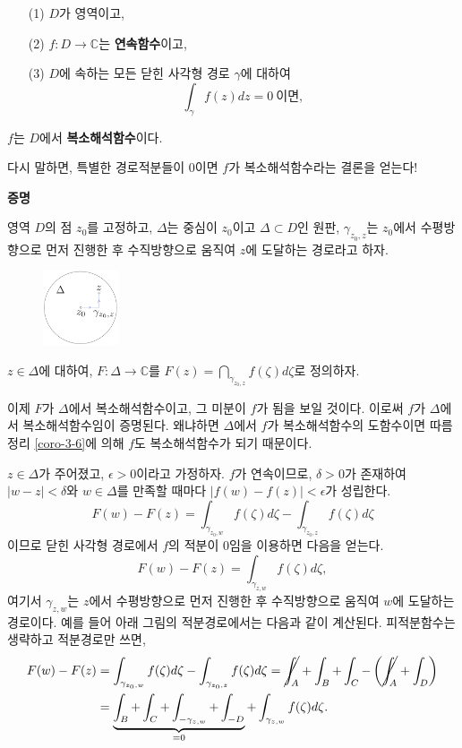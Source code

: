 
\begin{salttheorem}{}{} \label{thm-3-8}
\begin{itemize}
\item[(1)] $D$가 영역이고, 
\item[(2)] $f:D\to \mathbb C$는 \textbf{연속함수}이고,
\item[(3)] $D$에 속하는 모든 닫힌 사각형 경로 $\gamma$에 대하여
\[
\int_\gamma f(z)dz = 0 \ \text{이면},
\]
\end{itemize}
$f$는 $D$에서 \textbf{복소해석함수}이다.
\end{salttheorem}
다시 말하면, 특별한 경로적분들이 $0$이면
$f$가 복소해석함수라는 결론을 얻는다!

{\bf 증명}

영역 $D$의 점 $z_0$를 고정하고,
$\Delta$는 중심이 $z_0$이고 $\Delta \subset D$인 원판,
$\gamma_{z_0,z}$는 $z_0$에서 수평방향으로 먼저 진행한 후
수직방향으로 움직여 $z$에 도달하는 경로라고 하자.
\begin{figure}[h!]
\begin{center}
\includegraphics[width=0.2\textwidth]{./SaltChapter/figs/fig-3-0-12}
\end{center}
\end{figure}

$z\in\Delta$에 대하여,
$F:\Delta \to \mathbb C$를 $F(z) = \dint_{\gamma_{z_0,z}} f(\zeta)d\zeta$로
정의하자.

이제 $F$가 $\Delta$에서 복소해석함수이고, 그 미분이 $f$가 됨을 보일 것이다.
이로써 $f$가 $\Delta$에서 복소해석함수임이 증명된다. 왜냐하면
$\Delta$에서 $f$가 복소해석함수의 도함수이면 따름정리 \ref{coro-3-6}에 의해
$f$도 복소해석함수가 되기 때문이다.

$z\in \Delta$가 주어졌고, $\epsilon>0$이라고 가정하자.
$f$가 연속이므로, $\delta>0$가 존재하여
$|w-z|<\delta$와 $w\in \Delta$를 만족할 때마다
$|f(w) - f(z)| <\epsilon$가 성립한다.
\[
F(w) - F(z) = \int_{\gamma_{z_0,w}} f(\zeta) d\zeta
- \int_{\gamma_{z_0,z}} f(\zeta) d\zeta
\]
이므로
닫힌 사각형 경로에서 $f$의 적분이 $0$임을 이용하면 다음을 얻는다.
\[
F(w) - F(z) = \int_{\gamma_{z,w}} f(\zeta) d\zeta,
\]
여기서 $\gamma_{z,w}$는 $z$에서 수평방향으로 먼저 진행한 후
수직방향으로 움직여 $w$에 도달하는 경로이다.
예를 들어 아래 그림의 적분경로에서는 다음과 같이 계산된다. 
피적분함수는 생략하고 적분경로만 쓰면,
\begin{align*}
F(w) - F(z) 
&= \int_{\gamma_{z_0,w}} f(\zeta) d\zeta
- \int_{\gamma_{z_0,z}} f(\zeta) d\zeta
= \cancel{\int_A} + \int_B + \int_C - \left(\cancel{\int_A} + \int_D \right) \\
&= \underbrace{\int_B + \int_C + \int_{-\gamma_{z,w}} + \int_{-D}}_{=0}
+\int_{\gamma_{z,w}} f(\zeta) d\zeta.
\end{align*}

